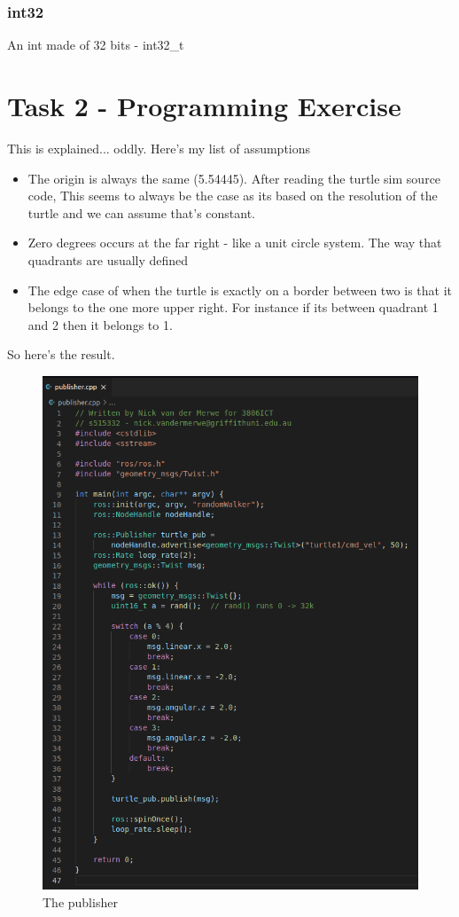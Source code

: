 \documentclass{article}
\begin{document}
\subsubsection{int32}
An int made of 32 bits - int32\_t

\section{Task 2 - Programming Exercise}
This is explained... oddly. Here's my list of assumptions
\begin{itemize}
    \item The origin is always the same (5.54445). After reading the turtle sim source code, This
    seems to always be the case as its based on the resolution of the turtle and we can assume that's constant.
    \item Zero degrees occurs at the far right - like a unit circle system. The way that quadrants are usually defined
    \item The edge case of when the turtle is exactly on a border between two
    is that it belongs to the one more upper right. For instance if its between 
    quadrant 1 and 2 then it belongs to 1.
\end{itemize}

So here's the result.
\newpage

\begin{figure}[h]
    \caption{The publisher}
    \centering
    \includegraphics[width=1\textwidth]{img/publisher.png}
\end{figure}
\end{document}
